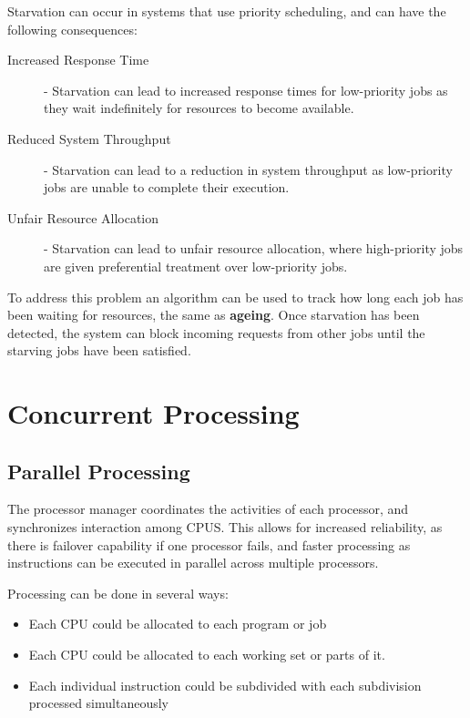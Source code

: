 \documentclass[12pt letter]{report}
\begin{document}

Starvation can occur in systems that use priority scheduling, and can
have the following consequences:
\begin{description}
  \item[Increased Response Time] - Starvation can lead to increased
    response times for low-priority jobs as they wait indefinitely
    for resources to become available.
  \item[Reduced System Throughput] - Starvation can lead to a
    reduction in system throughput as low-priority jobs are unable to
    complete their execution.
  \item[Unfair Resource Allocation] - Starvation can lead to unfair
    resource allocation, where high-priority jobs are given
    preferential treatment over low-priority jobs.
\end{description}

To address this problem an algorithm can be used to track how long
each job has been waiting for resources, the same as \textbf{ageing}.
Once starvation has been detected, the system can block incoming
requests from other jobs until the starving jobs have been satisfied.

\chapter{Concurrent Processing}

\section{Parallel Processing}


The processor manager coordinates the activities of each processor,
and synchronizes interaction among CPUS. This allows for increased
reliability, as there is failover capability if one processor fails,
and faster processing as instructions can be executed in parallel
across multiple processors.

Processing can be done in several ways:
\begin{itemize}
  \item Each CPU could be allocated to each program or job
  \item Each CPU could be allocated to each working set or parts of it.
  \item Each individual instruction could be subdivided with each
    subdivision processed simultaneously
\end{itemize}
\end{document}
